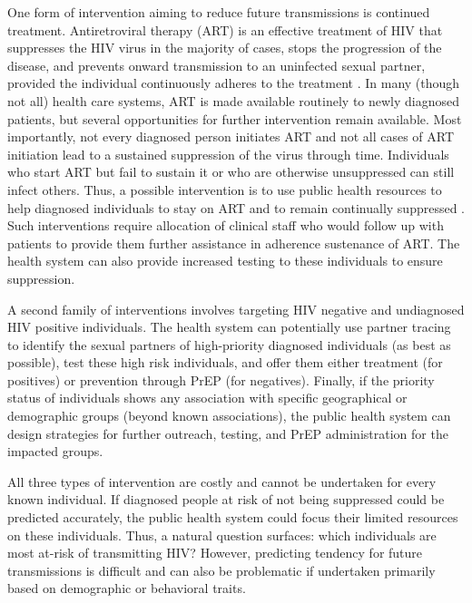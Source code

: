 \documentclass[oupdraft]{sysbio}
\begin{document}
One form of intervention aiming to reduce future transmissions is continued treatment. 
Antiretroviral therapy (ART) is an effective treatment of HIV that suppresses the HIV virus in the majority of cases, stops the progression of the disease, and prevents onward transmission to an uninfected sexual partner, provided the individual continuously adheres to the treatment \cite{Cohen2011}.
In  many (though not all) health care systems, ART is made available routinely  to newly diagnosed patients, but several opportunities for further intervention remain available. 
Most importantly, not every diagnosed person initiates ART and not all cases of ART initiation lead to a sustained suppression of the virus through time. 
Individuals who start ART but fail to sustain it or who are otherwise unsuppressed can still infect others. 
Thus, a possible intervention is to use public health resources to help diagnosed individuals to stay on ART and to remain continually suppressed \cite{Poon2016}. 
Such interventions require allocation of clinical staff who would follow up with patients to provide them further assistance in adherence sustenance of ART.
The health system can also provide  increased testing to these individuals to ensure suppression.  

A second family of interventions involves targeting HIV negative and undiagnosed HIV positive individuals.
The health system can potentially use partner tracing \cite{Gotz2014} to identify the sexual partners of high-priority diagnosed individuals (as best as possible), test these high risk individuals, and offer them either treatment (for positives) or prevention through PrEP (for negatives). 
Finally, if the  priority status of individuals shows any association with specific geographical or demographic groups (beyond known associations), the public health system can design strategies for further outreach, testing, and PrEP administration for the impacted groups.

All three types of intervention   are  costly and cannot be undertaken for every known individual.
If diagnosed people at risk of not being suppressed could be predicted accurately, the public health system could focus their limited resources on these individuals.
Thus, a natural question surfaces: which individuals are most at-risk of transmitting HIV? %
However, predicting tendency for future transmissions is difficult and can also be problematic if undertaken primarily based on demographic or behavioral traits.
\end{document}
